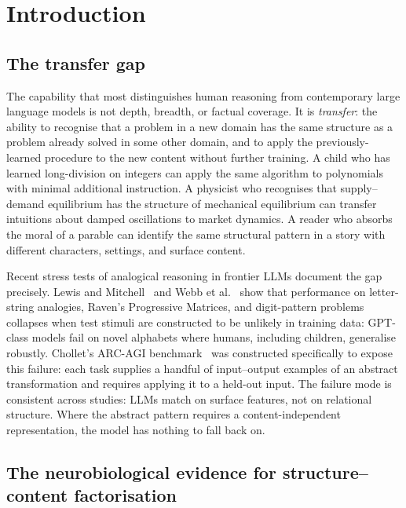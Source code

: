 \documentclass[11pt,a4paper]{article}
\theoremstyle{plain}
\theoremstyle{definition}
\theoremstyle{remark}
\begin{document}
\section{Introduction}
\label{sec:intro}

\subsection{The transfer gap}

The capability that most distinguishes human reasoning from contemporary large language models is not depth, breadth, or factual coverage. It is \emph{transfer}: the ability to recognise that a problem in a new domain has the same structure as a problem already solved in some other domain, and to apply the previously-learned procedure to the new content without further training. A child who has learned long-division on integers can apply the same algorithm to polynomials with minimal additional instruction. A physicist who recognises that supply--demand equilibrium has the structure of mechanical equilibrium can transfer intuitions about damped oscillations to market dynamics. A reader who absorbs the moral of a parable can identify the same structural pattern in a story with different characters, settings, and surface content.

Recent stress tests of analogical reasoning in frontier LLMs document the gap precisely. Lewis and Mitchell~\cite{lewis2024analogy} and Webb et al.~\cite{webb2023emergent} show that performance on letter-string analogies, Raven's Progressive Matrices, and digit-pattern problems collapses when test stimuli are constructed to be unlikely in training data: GPT-class models fail on novel alphabets where humans, including children, generalise robustly. Chollet's ARC-AGI benchmark~\cite{chollet2019arc, chollet2024onthemeasureofintelligence} was constructed specifically to expose this failure: each task supplies a handful of input--output examples of an abstract transformation and requires applying it to a held-out input. The failure mode is consistent across studies: LLMs match on surface features, not on relational structure. Where the abstract pattern requires a content-independent representation, the model has nothing to fall back on.

\subsection{The neurobiological evidence for structure--content factorisation}
\end{document}
